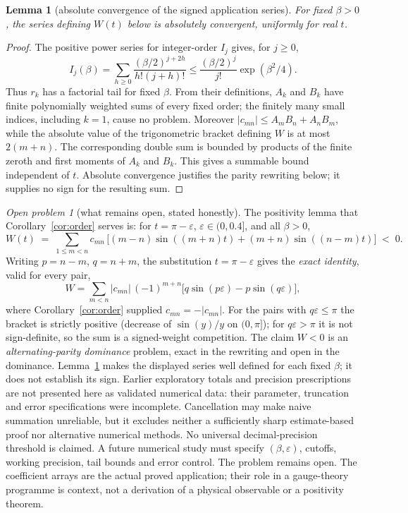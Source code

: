 \documentclass[11pt]{article}
\newtheorem{lemma}[theorem]{Lemma}
\theoremstyle{remark}
\newtheorem{problem}[theorem]{Open problem}
\begin{document}
\begin{lemma}[absolute convergence of the signed application series]
\label{lem:convergence}
For fixed $\beta>0$, the series defining $W(t)$ below is absolutely
convergent, uniformly for real $t$.
\end{lemma}
\begin{proof}
The positive power series for integer-order $I_j$ \cite[10.25.2]{DLMF}
gives, for $j\ge0$,
\[
 I_j(\beta)=\sum_{h\ge0}\frac{(\beta/2)^{j+2h}}{h!(j+h)!}
 \le \frac{(\beta/2)^j}{j!}\exp(\beta^2/4).
\]
Thus $r_k$ has a factorial tail for fixed $\beta$. From their definitions,
$A_k$ and $B_k$ have finite polynomially weighted sums of every fixed
order; the finitely many small indices, including $k=1$, cause no problem.
Moreover $|c_{mn}|\le A_mB_n+A_nB_m$, while the absolute value of the
trigonometric bracket defining $W$ is at most $2(m+n)$. The corresponding
double sum is bounded by products of the finite zeroth and first moments
of $A_k$ and $B_k$. This gives a summable bound independent of $t$.
Absolute convergence justifies the parity rewriting below; it supplies no
sign for the resulting sum.
\end{proof}

\begin{problem}[what remains open, stated honestly]
\label{prob:open}
The positivity lemma that Corollary~\ref{cor:order} serves is: for
$t = \pi - \varepsilon$, $\varepsilon \in (0, 0.4]$, and all
$\beta > 0$,
\[
W(t) \;=\; \sum_{1 \le m < n} c_{mn}\,
\bigl[(m-n)\sin((m+n)t) + (m+n)\sin((n-m)t)\bigr] \;<\; 0 .
\]
Writing $p = n-m$, $q = n+m$, the substitution $t = \pi -
\varepsilon$ gives the \emph{exact identity}, valid for every pair,
\[
W = \sum_{m<n} |c_{mn}|\,(-1)^{m+n}
\bigl[q\sin(p\varepsilon) - p\sin(q\varepsilon)\bigr],
\]
where Corollary~\ref{cor:order} supplied $c_{mn} = -|c_{mn}|$. For
the pairs with $q\varepsilon \le \pi$ the bracket is strictly
positive (decrease of $\sin(y)/y$ on $(0,\pi]$); for
$q\varepsilon > \pi$ it is not sign-definite, so the sum is a
signed-weight competition. The claim $W<0$ is an
\emph{alternating-parity dominance} problem, exact in the rewriting and
open in the dominance. Lemma~\ref{lem:convergence} makes the displayed
series well defined for each fixed $\beta$; it does not establish its sign.
Earlier exploratory totals and precision prescriptions are not presented
here as validated numerical data: their parameter, truncation and error
specifications were incomplete. Cancellation may make naive summation
unreliable, but it excludes neither a sufficiently sharp estimate-based
proof nor alternative numerical methods. No universal decimal-precision
threshold is claimed. A future numerical study must specify
$(\beta,\varepsilon)$, cutoffs, working precision, tail bounds and error
control. The problem remains open. The coefficient arrays are the actual
proved application; their role in a gauge-theory programme is context,
not a derivation of a physical observable or a positivity theorem.
\end{problem}
\end{document}
